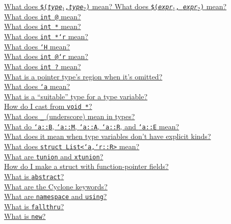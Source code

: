 \ifscreen
\begin{small}
\hyperlink{faq:tuple}{What does \texttt{\$({\it type}$_1$,{\it type}$_2$)} mean?  What does \texttt{\$({\it expr}$_1$, {\it expr}$_2$)} mean?}\\
\hyperlink{faq:non-null}{What does \texttt{int @} mean?}\\
\hyperlink{faq:bounds}{What does \texttt{int *\rb} mean?}\\
\hyperlink{faq:region}{What does \texttt{int *`r} mean?}\\
\hyperlink{faq:heapregion}{What does \texttt{`H} mean?}\\
\hyperlink{faq:boundsregion}{What does \texttt{int @\rb `r} mean?}\\
\hyperlink{faq:questionable}{What does \texttt{int ?} mean?}\\
\hyperlink{faq:omitregion}{What is a pointer type's region when it's omitted?}\\
\hyperlink{faq:typevar}{What does \texttt{`a} mean?}\\
\hyperlink{faq:suitable}{What is a ``suitable'' type for a type variable?}\\
\hyperlink{faq:voidstar}{How do I cast from \texttt{void *}?}\\
\hyperlink{faq:uscore-types}{What does \texttt{_} (underscore) mean in types?}\\
\hyperlink{faq:kinds}{What do \texttt{`a::B}, \texttt{`a::M}, \texttt{`a::A}, \texttt{`a::R}, and \texttt{`a::E} mean?}\\
\hyperlink{faq:nokinds}{What does it mean when type variables don't have explicit kinds?}\\
\hyperlink{faq:list}{What does \texttt{struct List<`a,`r::R>} mean?}\\
\hyperlink{faq:tagged}{What are \texttt{tunion} and \texttt{xtunion}?}\\
\hyperlink{faq:structfp}{How do I make a struct with function-pointer fields?}\\
\hyperlink{faq:abstract}{What is \texttt{abstract}?}\\
\hyperlink{faq:keywords}{What are the Cyclone keywords?}\\
\hyperlink{faq:namespace}{What are \texttt{namespace} and \texttt{using}?}\\
\hyperlink{faq:fallthru}{What is \texttt{fallthru}?}\\
\hyperlink{faq:new}{What is \texttt{new}?}\\

\end{small}
